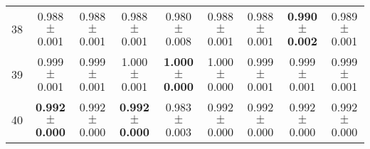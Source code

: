 \begin{table}[!ht]
{\begin{tabular}{r c c c c c c c c}
38 & 0.988 $\pm$ 0.001 & 0.988 $\pm$ 0.001 & 0.988 $\pm$ 0.001 & 0.980 $\pm$ 0.008 & 0.988 $\pm$ 0.001 & 0.988 $\pm$ 0.001 & \textbf{0.990 $\pm$ 0.002} & 0.989 $\pm$ 0.001 \\
39 & 0.999 $\pm$ 0.001 & 0.999 $\pm$ 0.001 & 1.000 $\pm$ 0.001 & \textbf{1.000 $\pm$ 0.000} & 1.000 $\pm$ 0.000 & 0.999 $\pm$ 0.001 & 0.999 $\pm$ 0.001 & 0.999 $\pm$ 0.001 \\
40 & \textbf{0.992 $\pm$ 0.000} & 0.992 $\pm$ 0.000 & \textbf{0.992 $\pm$ 0.000} & 0.983 $\pm$ 0.003 & 0.992 $\pm$ 0.000 & 0.992 $\pm$ 0.000 & 0.992 $\pm$ 0.000 & 0.992 $\pm$ 0.000 \\
\end{tabular}}
\end{table}
